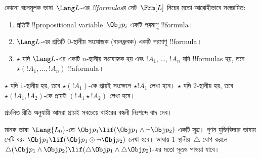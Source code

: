 \documentclass[../../../include/open-logic-section]{subfiles}
\begin{document}


\begin{defn}[সূত্র]
কোনো বচনমূলক ভাষা~$\Lang L$-এর \emph{!!{formula}s}র সেট~$\Frm[L]$
নিচের মতো আরোহীভাবে সংজ্ঞায়িত:
\begin{enumerate}
\item প্রতিটি !!{propositional variable}~$\Obj p_i$ একটি পরমাণু
  !!{formula}।
\item $\Lang L$-এর প্রতিটি $0$-স্থানীয় সংযোজক (বচনধ্রুবক) একটি পরমাণু
  !!{formula}।
\item $\star$ যদি $\Lang L$-এর একটি $n$-স্থানীয় সংযোজক হয় এবং $!A_1$,
\dots, $!A_n$ যদি !!{formula}s হয়, তবে $\star(!A_1, \dots, !A_n)$
  !!a{formula}।
\end{enumerate}
$\star$ যদি $1$-স্থানীয় হয়, তবে $\star(!A_1)$-কে প্রায়ই সংক্ষেপে
$\star !A_1$ লেখা হবে। $\star$ যদি $2$-স্থানীয় হয়, তবে
$\star(!A_1,!A_2)$-কে প্রায়ই $(!A_1 \star !A_2)$ লেখা হবে।
\end{defn}

প্রচলিত রীতি অনুযায়ী আমরা প্রায়ই সবচেয়ে বাইরের বন্ধনী নিঃশব্দে বাদ দেব।

\begin{ex}
  মানক ভাষা~$\Lang{L_0}$-তে $\Obj p_1 \lif (\Obj p_1
  \land \lnot \Obj p_2)$ একটি সূত্র। গুণন যুক্তিবিদ্যার ভাষায় সেটি
  বরং $\Obj p_1 \lif (\Obj p_1 \odot
  \lnot \Obj p_2)$ লেখা হবে। ভাষায় $1$-স্থানীয়~$\triangle$ যোগ করলে
  $\triangle (\Obj p_1
  \land \Obj p_2) \lif (\triangle \Obj p_1 \land \triangle \Obj p_2)$-এর
  মতো সূত্রও পাওয়া যাবে।
\end{ex}
\end{document}
